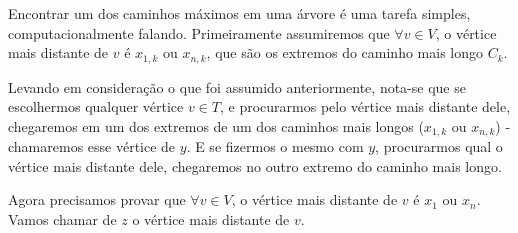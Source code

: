 \documentclass[a4paper,12pt]{article}
\begin{document}
        \bigskip

        Encontrar um dos caminhos máximos em uma árvore é uma 
        tarefa simples, computacionalmente falando. Primeiramente
        assumiremos que $\forall v \in V$, o vértice mais distante
        de $v$ é $x_{1, k}$ ou $x_{n, k}$, que são os extremos do
        caminho mais longo $C_k$.

        Levando em consideração o que foi assumido anteriormente,
        nota-se que se escolhermos 
        qualquer vértice $v \in T$, e procurarmos pelo vértice mais
        distante dele, chegaremos em um dos extremos de um dos 
        caminhos mais longos ($x_{1, k}$ 
        ou $x_{n, k}$) - chamaremos esse vértice de $y$.
        E se fizermos o mesmo com $y$, procurarmos qual o vértice 
        mais distante dele, chegaremos no
        outro extremo do caminho mais longo.
        

        Agora precisamos provar que $\forall v \in V$, o vértice 
        mais distante
        de $v$ é $x_1$ ou $x_n$.
        Vamos chamar de $z$ o vértice mais distante de $v$.
        
\end{document}
